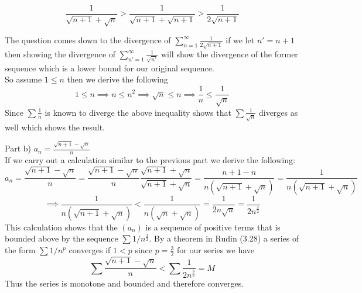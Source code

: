 \documentclass[11pt,reqno]{article}
\begin{document}
\begin{equation}
\frac{1}{\sqrt{n+1} + \sqrt{n}} > \frac{1}{\sqrt{n+1} + \sqrt{n+1}} > \frac{1}{2 \sqrt{n+1}} \nonumber
\end{equation}

The question comes down to the divergence of $\sum_{n = 1}^\infty \frac{1}{2 \sqrt{n+1}}$ if we let $n' = n+1$ then showing the divergence of $\sum_{n'=1}^\infty \frac{1}{\sqrt{n'}}$ will show the divergence of the former sequence which is a lower bound for our original sequence.\\
\indent So assume $1 \le n$ then we derive the following \[ 1 \le n \implies n \le n^2 \implies \sqrt{n} \le n \implies \frac{1}{n} \le \frac{1}{\sqrt{n}} \]
 Since $\sum \frac{1}{n}$ is known to diverge the above inequality shows that $\sum \frac{1}{\sqrt{n}}$ diverges as well which shows the result.

Part b) $a_n = \frac{\sqrt{n+1} - \sqrt{n}}{n}$\\
If we carry out a calculation similar to the previous part we derive the following:\\
\begin{equation}
a_n = \frac{\sqrt{n+1}-\sqrt{n}}{n} = \frac{\sqrt{n+1}-\sqrt{n}}{n} \frac{\sqrt{n+1} + \sqrt{n}}{\sqrt{n+1} + \sqrt{n}} = \frac{n+1 - n}{n(\sqrt{n+1} + \sqrt{n})} = \frac{1}{n(\sqrt{n+1} + \sqrt{n})} \nonumber
\end{equation}
\begin{equation}
\implies \frac{1}{n(\sqrt{n+1} + \sqrt{n})}  <   \frac{1}{n(\sqrt{n} + \sqrt{n})} =  \frac{1}{2n\sqrt{n}}= \frac{1}{2n^{\frac{3}{2}}} \nonumber
\end{equation}
This calculation shows that the $(a_n)$ is a sequence of positive terms that is bounded above by the sequence $\sum 1/n^{\frac{3}{2}}$. By a theorem in Rudin (3.28) a series of the form $\sum 1/n^p$ converges if $1 < p$ since $p = \frac{3}{2}$ for our series we have 
\[  \sum \frac{\sqrt{n+1} - \sqrt{n}}{n} <  \sum \frac{1}{2 n^{\frac{3}{2}}} = M \]
Thus the series is monotone and bounded and therefore converges.\\
\end{document}
